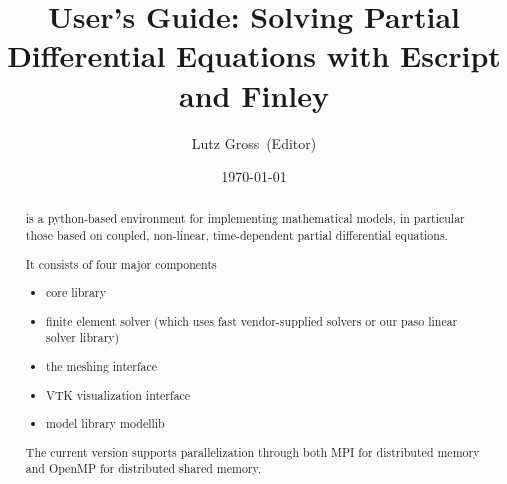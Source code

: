 \documentclass{manual}
\title{\esys User's Guide: Solving Partial Differential Equations with Escript and Finley}
\author{Lutz Gross\etal~(Editor)}
\date{\today}
\begin{document}
\maketitle



\begin{abstract}
\escript is a python-based environment for implementing mathematical models, in particular those based on coupled, non-linear, time-dependent partial differential equations.

It consists of four major components
\begin{itemize}
\item \escript core library
\item finite element solver \finley (which uses fast vendor-supplied solvers or our paso linear solver library)
\item the meshing interface \pycad
\item VTK visualization interface \pyvisi
\item model library modellib
\end{itemize}
The current version supports parallelization through both MPI for distributed memory and OpenMP for distributed shared memory. 
\end{abstract}

\tableofcontents














% 

%



\makemodindex

\printindex
%



\end{document}
